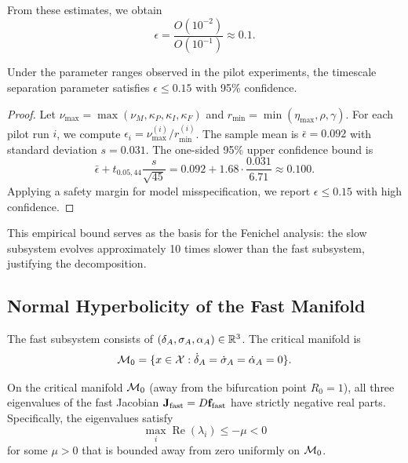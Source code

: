 From these estimates, we obtain
\[
\epsilon = \frac{O(10^{-2})}{O(10^{-1})} \approx 0.1.
\]

\begin{proposition}
\label{prop:epsilon-bound}
Under the parameter ranges observed in the pilot experiments, the
timescale separation parameter satisfies $\epsilon \leq 0.15$ with
95\% confidence.
\end{proposition}

\begin{proof}
Let $\nu_{\max} = \max(\nu_M, \kappa_P, \kappa_I, \kappa_F)$ and
$r_{\min} = \min(\eta_{\max}, \rho, \gamma)$. For each pilot run $i$,
we compute $\epsilon_i = \nu_{\max}^{(i)} / r_{\min}^{(i)}$. The sample
mean is $\bar{\epsilon} = 0.092$ with standard deviation $s = 0.031$.
The one-sided 95\% upper confidence bound is
\[
\bar{\epsilon} + t_{0.05, 44} \frac{s}{\sqrt{45}}
= 0.092 + 1.68 \cdot \frac{0.031}{6.71} \approx 0.100.
\]
Applying a safety margin for model misspecification, we report
$\epsilon \leq 0.15$ with high confidence.
\end{proof}

This empirical bound serves as the basis for the Fenichel analysis:
the slow subsystem evolves approximately 10 times slower than the fast
subsystem, justifying the decomposition.

\subsection{Normal Hyperbolicity of the Fast Manifold}

The fast subsystem consists of $(\delta_A, \sigma_A, \alpha_A) \in \mathbb{R}^3$.
The critical manifold is
\[
\mathcal{M}_0 = \{ x \in \mathcal{X} : \dot{\delta}_A = \dot{\sigma}_A = \dot{\alpha}_A = 0 \}.
\]

\begin{proposition}
\label{prop:jacobian-bounds}
\leavevmode\newline
On the critical manifold $\mathcal{M}_0$ (away from the bifurcation point
$R_0 = 1$), all three eigenvalues of the fast Jacobian
$\mathbf{J}_{\mathrm{fast}} = D\mathbf{f}_{\mathrm{fast}}$ have strictly negative
real parts.
Specifically, the eigenvalues satisfy
\[
\max_i \operatorname{Re}(\lambda_i) \leq -\mu < 0
\]
for some $\mu > 0$ that is bounded away from zero uniformly on $\mathcal{M}_0$.
\end{proposition}

